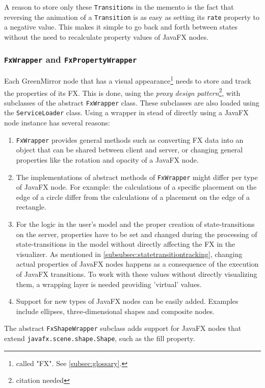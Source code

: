 \documentclass[a4paper]{article}
\begin{document}
	A reason to store only these \lstinline{Transition}s in the memento is the fact that reversing the animation of a \lstinline{Transition} is as easy as setting its \lstinline{rate} property to a negative value. This makes it simple to go back and forth between states without the need to recalculate property values of JavaFX nodes.
	
	
	\subsubsection{\lstinline{FxWrapper} and \lstinline{FxPropertyWrapper}}\label{subsubsec:fxwrapper}
	Each GreenMirror node that has a visual appearance\footnote{called "FX". See \cref{subsec:glossary}.} needs to store and track the properties of its FX. This is done, using the \emph{proxy design pattern}\footnote{citation needed}, with subclasses of the abstract \lstinline{FxWrapper} class. These subclasses are also loaded using the \lstinline{ServiceLoader} class. Using a wrapper in stead of directly using a JavaFX node instance has several reasons:
	\begin{enumerate}
		\item \lstinline{FxWrapper} provides general methods such as converting FX data into an object that can be shared between client and server, or changing general properties like the rotation and opacity of a JavaFX node.
		\item The implementations of abstract methods of \lstinline{FxWrapper} might differ per type of JavaFX node. For example: the calculations of a specific placement on the edge of a circle differ from the calculations of a placement on the edge of a rectangle.
		\item For the logic in the user's model and the proper creation of state-transitions on the server, properties have to be set and changed during the processing of state-transitions in the model without directly affecting the FX in the visualizer. As mentioned in \cref{subsubsec:statetransitiontracking}, changing actual properties of JavaFX nodes happens as a consequence of the execution of JavaFX transitions. To work with these values without directly visualizing them, a wrapping layer is needed providing 'virtual' values. 
		\item Support for new types of JavaFX nodes can be easily added. Examples include ellipses, three-dimensional shapes and composite nodes.
	\end{enumerate}
	The abstract \lstinline{FxShapeWrapper} subclass adds support for JavaFX nodes that extend \lstinline{javafx.scene.shape.Shape}, such as the fill property.
	
\end{document}
